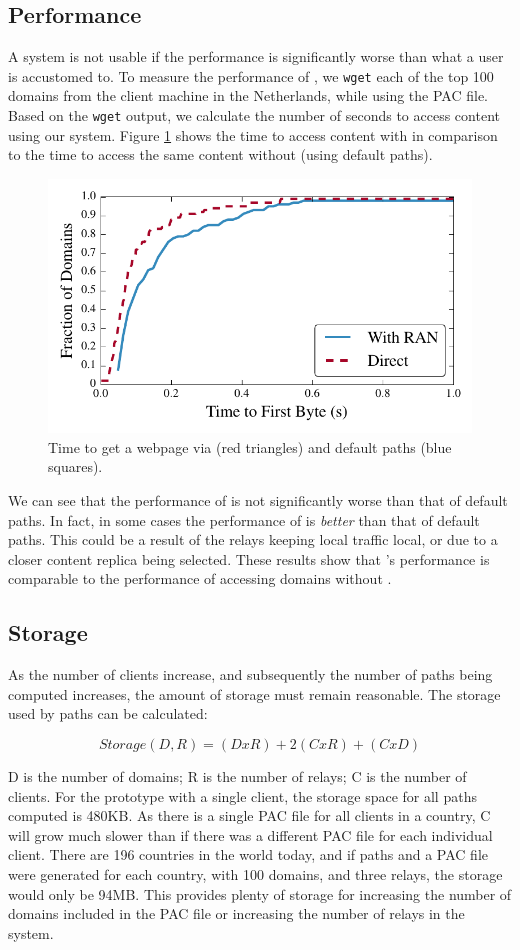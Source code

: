 \subsection{Performance}
A system is not usable if the performance is significantly worse than what a user
is accustomed to.  To measure the performance of \system{}, we {\tt wget} each 
of the top 100 domains from the client machine in the Netherlands, while 
using the PAC file.  Based on the {\tt wget} output, we calculate the number 
of seconds to access content using our system. Figure \ref{fig:latency} shows 
the time to access content with \system{} in comparison to the time to access the 
same content without \system{} (using default paths).  

\begin{figure}[t]
\centering
\includegraphics[width=.5\textwidth]{latency}
\caption{Time to get a webpage via \system{} (red triangles) and default paths (blue squares).}
\label{fig:latency}
\end{figure}

We can see that the performance of \system{} is not significantly worse than that 
of default paths.  In fact, in some cases the performance of \system{} is {\it 
better} than that of default paths.  This could be a result of the relays 
keeping local traffic local, or due to a closer content replica being selected. 
These results show that \system{}'s performance is comparable to the performance 
of accessing domains without \system{}.

\subsection{Storage}
As the number of clients increase, and subsequently the number of paths being 
computed increases, the amount of storage must remain reasonable.  The storage 
used by paths can be calculated:

\[Storage(D,R) = (D x R) + 2(C x R) + (C x D) \]

D is the number of domains; R is the number of relays; C is the number of 
clients.  For the prototype with a single client, the storage space for all 
paths computed is 480KB.  As there is a single PAC file for all clients in 
a country, C will grow much slower than if there was a different PAC file for 
each individual client.  There are 196 countries in the world today, and if 
paths and a PAC file were generated for each country, with 100 domains, and 
three relays, the storage would only be 94MB.  This provides plenty of storage 
for increasing the number of domains included in the PAC file or increasing 
the number of relays in the system.

